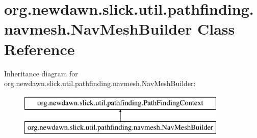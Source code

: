 \hypertarget{classorg_1_1newdawn_1_1slick_1_1util_1_1pathfinding_1_1navmesh_1_1_nav_mesh_builder}{}\section{org.\+newdawn.\+slick.\+util.\+pathfinding.\+navmesh.\+Nav\+Mesh\+Builder Class Reference}
\label{classorg_1_1newdawn_1_1slick_1_1util_1_1pathfinding_1_1navmesh_1_1_nav_mesh_builder}
Inheritance diagram for org.\+newdawn.\+slick.\+util.\+pathfinding.\+navmesh.\+Nav\+Mesh\+Builder\+:\begin{figure}[H]
\begin{center}
\leavevmode
\includegraphics[height=2.000000cm]{classorg_1_1newdawn_1_1slick_1_1util_1_1pathfinding_1_1navmesh_1_1_nav_mesh_builder}
\end{center}
\end{figure}
